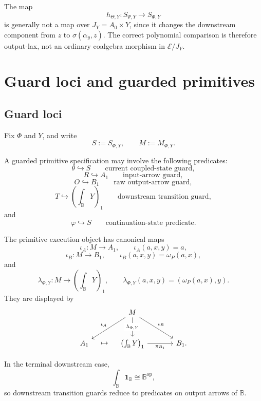 \begin{remark}
\label{rem:poly-relative-not-ordinary-coalgebra-map}
The map
\[
h_{\Theta,Y}:S_{\Psi,Y}\to S_{\Phi,Y}
\]
is generally not a map over \(J_Y=A_0\times Y\), since it changes the
downstream component from \(z\) to \(\sigma(\alpha_y,z)\).  The correct
polynomial comparison is therefore output-lax, not an ordinary coalgebra
morphism in \(\mathcal E/J_Y\).
\end{remark}

\section{Guard loci and guarded primitives}
\label{sec:poly-relative-guard-loci-primitives}

\subsection{Guard loci}
\label{subsec:poly-relative-guard-loci}

Fix \(\Phi\) and \(Y\), and write
\[
S:=S_{\Phi,Y},
\qquad
M:=M_{\Phi,Y}.
\]

A guarded primitive specification may involve the following predicates:
\[
\theta\hookrightarrow S
\qquad
\text{current coupled-state guard},
\]
\[
R\hookrightarrow A_1
\qquad
\text{input-arrow guard},
\]
\[
O\hookrightarrow B_1
\qquad
\text{raw output-arrow guard},
\]
\[
T\hookrightarrow\left(\int_{\mathbb B}Y\right)_1
\qquad
\text{downstream transition guard},
\]
and
\[
\varphi\hookrightarrow S
\qquad
\text{continuation-state predicate}.
\]

The primitive execution object has canonical maps
\[
\iota_A:M\to A_1,
\qquad
\iota_A(a,x,y)=a,
\]
\[
\iota_B:M\to B_1,
\qquad
\iota_B(a,x,y)=\omega_P(a,x),
\]
and
\[
\lambda_{\Phi,Y}:M\to\left(\int_{\mathbb B}Y\right)_1,
\qquad
\lambda_{\Phi,Y}(a,x,y)=(\omega_P(a,x),y).
\]
They are displayed by
\[
\begin{tikzcd}[column sep=large,row sep=large]
&
M
  \arrow[dl,"\iota_A"']
  \arrow[d,"\lambda_{\Phi,Y}" description]
  \arrow[dr,"\iota_B"]
&
\\
A_1
&
\left(\int_{\mathbb B}Y\right)_1
  \arrow[l,phantom,"\mapsto"]
  \arrow[r,"\pi_{B_1}"']
&
B_1 .
\end{tikzcd}
\]

In the terminal downstream case,
\[
\int_{\mathbb B}\mathbf 1_{\mathbb B}\cong\mathbb B^{\mathrm{op}},
\]
so downstream transition guards reduce to predicates on output arrows of
\(\mathbb B\).

